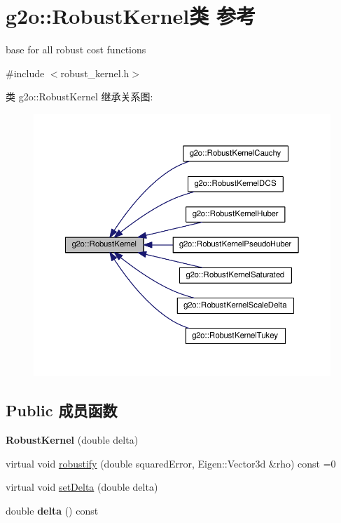 \hypertarget{classg2o_1_1RobustKernel}{\section{g2o\-:\-:Robust\-Kernel类 参考}
\label{classg2o_1_1RobustKernel}
}


base for all robust cost functions  




{\ttfamily \#include $<$robust\-\_\-kernel.\-h$>$}



类 g2o\-:\-:Robust\-Kernel 继承关系图\-:
\nopagebreak
\begin{figure}[H]
\begin{center}
\leavevmode
\includegraphics[width=350pt]{classg2o_1_1RobustKernel__inherit__graph}
\end{center}
\end{figure}
\subsection*{Public 成员函数}
\begin{DoxyCompactItemize}
\item 
\hypertarget{classg2o_1_1RobustKernel_aabd6883d9c5e33b567453585a80c7ad8}{{\bfseries Robust\-Kernel} (double delta)}\label{classg2o_1_1RobustKernel_aabd6883d9c5e33b567453585a80c7ad8}

\item 
virtual void \hyperlink{classg2o_1_1RobustKernel_ab47b071a0cfe466be063f0104bc41d0f}{robustify} (double squared\-Error, Eigen\-::\-Vector3d \&rho) const =0
\item 
virtual void \hyperlink{classg2o_1_1RobustKernel_a8d85269635c436fca51324d7cb16a798}{set\-Delta} (double delta)
\item 
\hypertarget{classg2o_1_1RobustKernel_a8c94f88f5c97f47c519a9adb44b4da36}{double {\bfseries delta} () const }\label{classg2o_1_1RobustKernel_a8c94f88f5c97f47c519a9adb44b4da36}

\end{DoxyCompactItemize}
